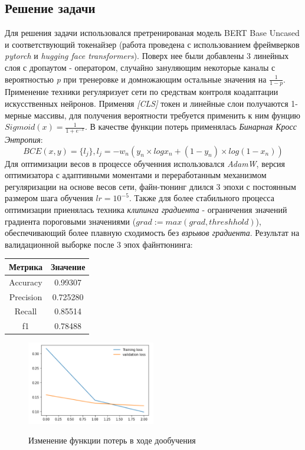 \subsection{Решение задачи}
Для решения задачи использовался претренированая модель BERT Base Uncased и соответствующий токенайзер (работа проведена с использованием фреймверков \textit{pytorch} и \textit{hugging face transformers}). Поверх нее были добавлены 3 линейных слоя с дропаутом - оператором, случайно зануляющим некоторые каналы с вероятностью \textit{p} при тренеровке и домножающим остальные значения на $\frac{1}{1-p}$. Применение техники регуляризует сети по средствам контроля коадаптации искусственных нейронов.
\newline
Применяя \textit{[CLS]} токен и линейные слои получаются 1-мерные массивы, для получения вероятности требуется применить к ним фунцию $Sigmoid(x) = \frac{1}{1+e^{-x}}$. В качестве функции потерь применялась \textit{Бинарная Кросс Энтропия}:
\begin{equation} \label{BCE}
    BCE(x,y)=\{l_{j}\}, l_{j} = −w_{n}\left(y_{n}\times log x_{n}+(1−y_{n})\times log (1 - x_{n})\right)
\end{equation}
Для оптимизации весов в процессе обученния использовался \textit{AdamW}, версия оптимизатора с адаптивными моментами и переработанным механизмом регуляризации на основе весов сети, файн-тюнинг длился 3 эпохи с постоянным размером шага обучения $lr=10^{-5}$. Также для более стабильного процесса оптимизации приенялась техника \textit{клипинга градиента} - ограничения значений градиента пороговыми значениями ($grad := max(grad, threshhold)$), обеспечивающий более плавную сходимость без \textit{взрывов градиента}.
Результат на валидационной выборке после 3 эпох файнтюнинга:
\begin{center}
\begin{tabular}{ |c|c| } 
 \hline
 Метрика & Значение\\ 
 \hline
 Accuracy & 0.99307\\ 
 \hline
 Precision & 0.725280\\ 
 \hline
  Recall & 0.85514\\ 
 \hline
  f1 & 0.78488\\ 
 \hline
\end{tabular}
\end{center}

\begin{figure}[h]
\caption{Изменение функции потерь в ходе дообучения}
\centering
\includegraphics[width=0.5\textwidth]{loss_bert.png}
\label{loss}
\end{figure}

